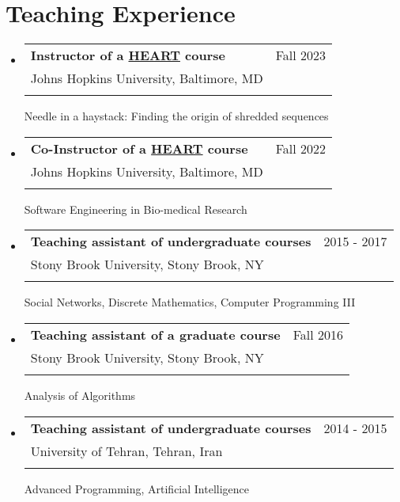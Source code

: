 \documentclass[A4,11pt]{article}
\makeatletter
\newcommand{\CVSubheading}[4]{
  \vspace{-2pt}\item
    \begin{tabular*}{0.97\textwidth}[t]{l@{\extracolsep{\fill}}r}
      \textbf{#1} & #2 \\
      \small#3 & \small #4 \\
    \end{tabular*}\vspace{-7pt}
}
\newcommand{\CVSubHeadingListStart}{\begin{itemize}[leftmargin=0.5cm, label={}]}
\newcommand{\CVSubHeadingListEnd}{\end{itemize}}
\makeatother
\begin{document}
\begin{comment}
Section is here as it applied to my application for positions in academia. 
Remember to tailor the resume for to the position.
\end{comment}

\section{Teaching Experience}
  \CVSubHeadingListStart
  \CVSubheading
  {Instructor of a \href{https://engineering.jhu.edu/education/undergraduate-studies/heart-heroic-courses/}{HEART} course}{Fall 2023}
  {Johns Hopkins University, Baltimore, MD}\\
  {Needle in a haystack: Finding the origin of shredded sequences}

  \CVSubheading
  {Co-Instructor of a \href{https://engineering.jhu.edu/education/undergraduate-studies/heart-heroic-courses/}{HEART} course}{Fall 2022}
  {Johns Hopkins University, Baltimore, MD}\\
  {Software Engineering in Bio-medical Research}

  \CVSubheading
      {Teaching assistant of undergraduate courses}{2015 - 2017}
      {Stony Brook University, Stony Brook, NY} \\
      {Social Networks, Discrete Mathematics, Computer Programming III}
    \CVSubheading
      {Teaching assistant of a graduate course}{Fall 2016}
      {Stony Brook University, Stony Brook, NY}\\
      {Analysis of Algorithms}
    \CVSubheading
      {Teaching assistant of undergraduate courses}{2014 - 2015}
      {University of Tehran, Tehran, Iran}\\
      {Advanced Programming, Artificial Intelligence}
    \CVSubHeadingListEnd
  
%

	\nocite{*}
	
\end{document}

